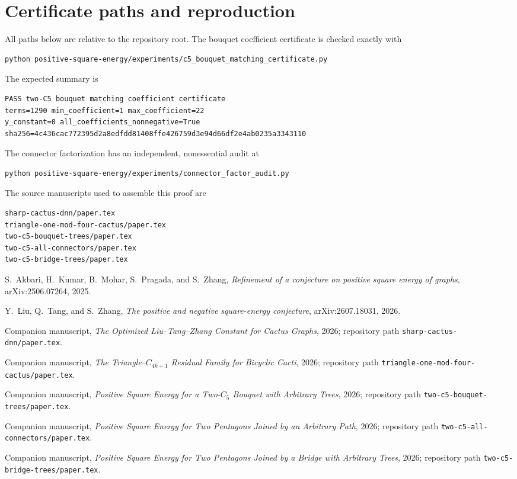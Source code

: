 \documentclass[11pt]{article}
\theoremstyle{remark}
\begin{document}
\appendix
\section{Certificate paths and reproduction}\label{app:certificates}

All paths below are relative to the repository root.  The bouquet coefficient
certificate is checked exactly with
\begin{verbatim}
python positive-square-energy/experiments/c5_bouquet_matching_certificate.py
\end{verbatim}
The expected summary is
\begin{verbatim}
PASS two-C5 bouquet matching coefficient certificate
terms=1290 min_coefficient=1 max_coefficient=22
y_constant=0 all_coefficients_nonnegative=True
sha256=4c436cac772395d2a8edfdd81408ffe426759d3e94d66df2e4ab0235a3343110
\end{verbatim}
The connector factorization has an independent, nonessential audit at
\begin{verbatim}
python positive-square-energy/experiments/connector_factor_audit.py
\end{verbatim}
The source manuscripts used to assemble this proof are
\begin{verbatim}
sharp-cactus-dnn/paper.tex
triangle-one-mod-four-cactus/paper.tex
two-c5-bouquet-trees/paper.tex
two-c5-all-connectors/paper.tex
two-c5-bridge-trees/paper.tex
\end{verbatim}

\begin{thebibliography}{99}
S.~Akbari, H.~Kumar, B.~Mohar, S.~Pragada, and S.~Zhang,
\emph{Refinement of a conjecture on positive square energy of graphs},
arXiv:2506.07264, 2025.

Y.~Liu, Q.~Tang, and S.~Zhang,
\emph{The positive and negative square-energy conjecture},
arXiv:2607.18031, 2026.

Companion manuscript, \emph{The Optimized Liu--Tang--Zhang Constant for
Cactus Graphs}, 2026; repository path \texttt{sharp-cactus-dnn/paper.tex}.

Companion manuscript, \emph{The Triangle--$C_{4k+1}$ Residual Family for
Bicyclic Cacti}, 2026; repository path
\texttt{triangle-one-mod-four-cactus/paper.tex}.

Companion manuscript, \emph{Positive Square Energy for a Two-$C_5$ Bouquet
with Arbitrary Trees}, 2026; repository path
\texttt{two-c5-bouquet-trees/paper.tex}.

Companion manuscript, \emph{Positive Square Energy for Two Pentagons Joined
by an Arbitrary Path}, 2026; repository path
\texttt{two-c5-all-connectors/paper.tex}.

Companion manuscript, \emph{Positive Square Energy for Two Pentagons Joined
by a Bridge with Arbitrary Trees}, 2026; repository path
\texttt{two-c5-bridge-trees/paper.tex}.
\end{thebibliography}
\end{document}
